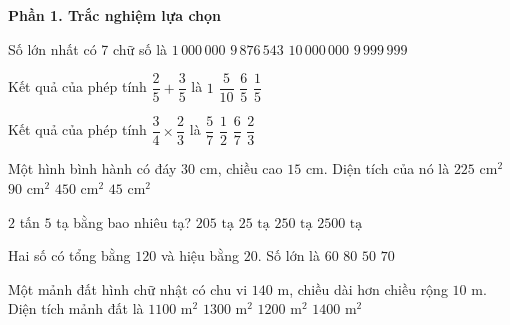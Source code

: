 \textbf{Phần 1. Trắc nghiệm lựa chọn}

\begin{ex} %
Số lớn nhất có 7 chữ số là
\choice
{$1\,000\,000$}
{$9\,876\,543$}
{$10\,000\,000$}
{\True $9\,999\,999$}
\end{ex}

\begin{ex} %
Kết quả của phép tính $\dfrac{2}{5} + \dfrac{3}{5}$ là
\choice
{\True $1$}
{$\dfrac{5}{10}$}
{$\dfrac{6}{5}$}
{$\dfrac{1}{5}$}
\end{ex}

\begin{ex} %
Kết quả của phép tính $\dfrac{3}{4} \times \dfrac{2}{3}$ là
\choice
{$\dfrac{5}{7}$}
{\True $\dfrac{1}{2}$}
{$\dfrac{6}{7}$}
{$\dfrac{2}{3}$}
\end{ex}

\begin{ex} %
Một hình bình hành có đáy $30\text{ cm}$, chiều cao $15\text{ cm}$. Diện tích của nó là
\choice
{$225\text{ cm}^2$}
{$90\text{ cm}^2$}
{\True $450\text{ cm}^2$}
{$45\text{ cm}^2$}
\end{ex}

\begin{ex} %
$2$ tấn $5$ tạ bằng bao nhiêu tạ?
\choice
{$205\text{ tạ}$}
{\True $25\text{ tạ}$}
{$250\text{ tạ}$}
{$2500\text{ tạ}$}
\end{ex}

\begin{ex} %
Hai số có tổng bằng $120$ và hiệu bằng $20$. Số lớn là
\choice
{$60$}
{$80$}
{$50$}
{\True $70$}
\end{ex}

\begin{ex} %
Một mảnh đất hình chữ nhật có chu vi $140\text{ m}$, chiều dài hơn chiều rộng $10\text{ m}$. Diện tích mảnh đất là
\choice
{$1100\text{ m}^2$}
{$1300\text{ m}^2$}
{\True $1200\text{ m}^2$}
{$1400\text{ m}^2$}
\end{ex}

